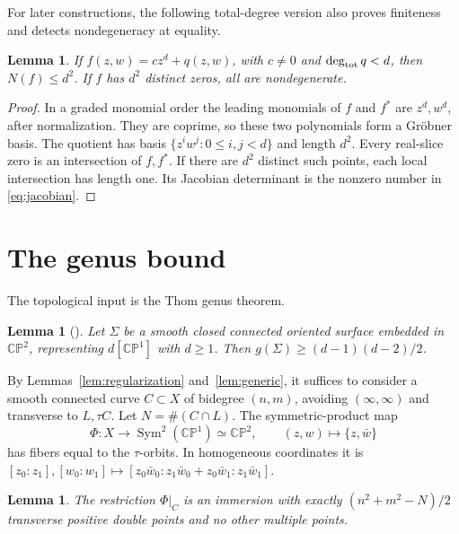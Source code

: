 \documentclass[a4paper]{amsart}
\newtheorem{lem}[thm]{Lemma}
\theoremstyle{remark}
\newcommand{\CP}{\mathbb {CP}}
\begin{document}
For later constructions, the following total-degree version
also proves finiteness and detects nondegeneracy at equality.

\begin{lem}\label{lem:pure}
If \(f(z,w)=cz^d+q(z,w)\), with \(c\ne0\) and
\(\deg_{\rm tot}q<d\), then \(N(f)\le d^2\).
If \(f\) has \(d^2\) distinct zeros, all are nondegenerate.
\end{lem}

\begin{proof}
In a graded monomial order the leading monomials of \(f\)
and \(f^*\) are \(z^d,w^d\), after normalization.
They are coprime, so these two polynomials form a
Gr\"obner basis. The quotient has basis
\(\{z^iw^j:0\le i,j<d\}\) and length \(d^2\).
Every real-slice zero is an intersection of \(f,f^*\).
If there are \(d^2\) distinct such points, each local
intersection has length one. Its Jacobian determinant is
the nonzero number in \eqref{eq:jacobian}.
\end{proof}

\section{The genus bound}\label{sec:genus}

The topological input is the Thom genus theorem.

\begin{lem}[{\cite[Theorem 1]{KM94}}]\label{lem:thom}
Let \(\Sigma\) be a smooth closed connected oriented surface
embedded in \(\CP^2\), representing
\(d[\CP^1]\) with \(d\ge1\).
Then \(g(\Sigma)\ge(d-1)(d-2)/2\).
\end{lem}

By Lemmas~\ref{lem:regularization} and~\ref{lem:generic},
it suffices to consider a smooth connected curve
\(C\subset X\) of bidegree \((n,m)\), avoiding
\((\infty,\infty)\) and transverse to \(L,\tau C\).
Let \(N=\#(C\cap L)\).
The symmetric-product map
\begin{equation}\label{eq:quotient}
 \Phi:X\longrightarrow\operatorname{Sym}^2(\CP^1)\simeq\CP^2,
 \qquad (z,w)\longmapsto\{z,\bar w\}
\end{equation}
has fibers equal to the \(\tau\)-orbits. In homogeneous
coordinates it is
\([z_0:z_1],[w_0:w_1]\mapsto
[z_0\bar w_0:z_1\bar w_0+z_0\bar w_1:z_1\bar w_1]\).

\begin{lem}\label{lem:immersion}
The restriction \(\Phi|_C\) is an immersion with exactly
\((n^2+m^2-N)/2\) transverse positive double points
and no other multiple points.
\end{lem}
\end{document}
